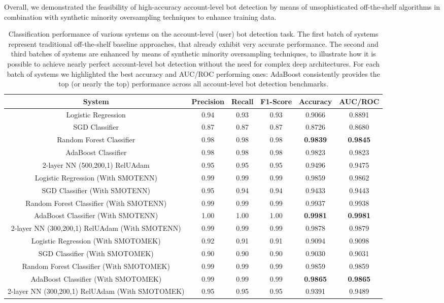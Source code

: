 Overall, we demonstrated the feasibility of high-accuracy account-level bot detection by means of unsophisticated off-the-shelf algorithms in combination with synthetic minority oversampling techniques to enhance training data.

\begin{table*}[t]\small
  \centering
  \begin{tabular}{ |c|c|c|c|c|c| }
    \hline 
System & Precision & Recall & F1-Score & Accuracy & AUC/ROC \\
  \hline
  Logistic Regression & 0.94 & 0.93 & 0.93 & 0.9066 & 0.8891 \\ 
  SGD Classifier & 0.87 & 0.87 & 0.87 & 0.8726 & 0.8680 \\ 
  Random Forest Classifier & 0.98 & 0.98 & 0.98 & \textbf{0.9839} & \textbf{0.9845} \\ 
  AdaBoost Classifier & 0.98 & 0.98 & 0.98 & 0.9823 & 0.9823 \\ 
  2-layer NN (500,200,1) RelUAdam & 0.95 & 0.95 & 0.95 & 0.9496 & 0.9475 \\ \hline 
  Logistic Regression  (With SMOTENN) & 0.99 & 0.99 & 0.99 & 0.9859 & 0.9862 \\ 
SGD Classifier (With SMOTENN) & 0.95 & 0.94 & 0.94 & 0.9433 & 0.9443 \\ 
Random Forest Classifier (With SMOTENN) & 0.99 & 0.99 & 0.99 & 0.9937 & 0.9938 \\ 
AdaBoost Classifier (With SMOTENN)  & 1.00 & 1.00 & 1.00 & \textbf{0.9981} & \textbf{0.9981} \\ 
2-layer NN (300,200,1) RelUAdam (With SMOTENN) & 0.99 & 0.99 & 0.99 & 0.9878 & 0.9879 \\ \hline 
  Logistic Regression (With SMOTOMEK) & 0.92 & 0.91 & 0.91 & 0.9094 & 0.9098 \\ 
SGD Classifier (With SMOTOMEK) & 0.90 & 0.90 & 0.90 & 0.9030 & 0.9031 \\ 
Random Forest Classifier (With SMOTOMEK) & 0.99 & 0.99 & 0.99 & 0.9859 & 0.9859 \\ 
AdaBoost Classifier (With SMOTOMEK) & 0.99 & 0.99 & 0.99 & \textbf{0.9865} & \textbf{0.9865} \\ 
2-layer NN (300,200,1) RelUAdam (With SMOTOMEK) & 0.95 & 0.95 & 0.95 & 0.9391 & 0.9489 \\ 
\hline
  \end{tabular}
  \caption{Classification performance of various systems on the account-level (user) bot detection task. The first batch of systems represent traditional off-the-shelf baseline approaches, that already exhibit very accurate performance. The second and third batches of systems are enhanced by means of synthetic minority oversampling techniques, to illustrate how it is possible to achieve nearly perfect account-level bot detection without the need for complex deep architectures. For each batch of systems we highlighted the best accuracy and AUC/ROC performing ones: AdaBoost consistently provides the top (or nearly the top) performance across all account-level bot detection benchmarks. }
  \label{tab:1}\vspace*{-.6cm}
\end{table*}

